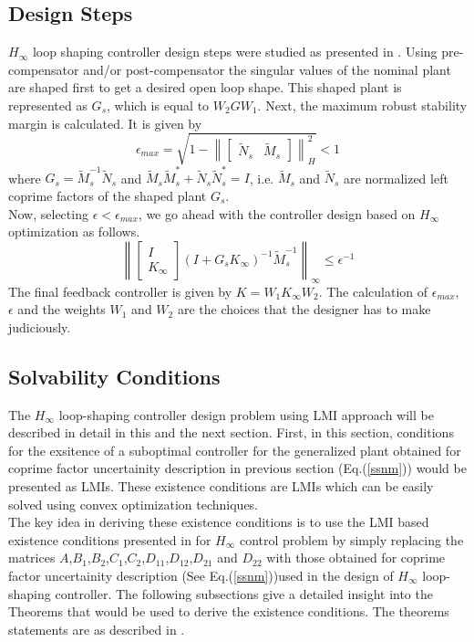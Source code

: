 \documentclass[a4paper,12pt]{article}
\newcommand\norm[1]{\left\lVert#1\right\rVert}
\begin{document}
 	\subsection{Design Steps}	
	$H_{\infty}$  loop shaping controller design steps were studied as presented in \cite{book}. Using pre-compensator and/or post-compensator the singular values of the nominal plant are shaped first to get a desired open loop shape. This shaped plant is represented as $G_{s}$, which is equal to $W_{2}GW_{1}$. Next, the maximum robust stability margin is calculated. It is given by
	\begin{equation}
		\epsilon_{max} = \sqrt{1-\norm{\begin{bmatrix}
		\tilde{N}_{s} & \tilde{M}_{s}\end{bmatrix}}_{H}^{2}} < 1
	\end{equation}
	where $G_{s} = \tilde{M}_{s}^{-1}\tilde{N}_{s}$ and $\tilde{M}_{s}\tilde{M}_{s}^{*} + \tilde{N}_{s}\tilde{N}_{s}^{*} = I $, i.e. $\tilde{M}_{s}$ and $\tilde{N}_{s}$ are normalized left coprime factors of the shaped plant $G_{s}$.\\
	Now, selecting $\epsilon < \epsilon_{max}$, we go ahead with the controller design based on $H_{\infty}$ optimization as follows.
	\begin{equation}
	\norm{\begin{bmatrix}
	I \\ K_{\infty}
	\end{bmatrix}
	(I+G_{s}K_{\infty})^{-1}\tilde{M}_{s}^{-1}}_{\infty} \leq \epsilon^{-1}
	\end{equation}
	The final feedback controller is given by $K=W_{1}K_{\infty}W_{2}$. The calculation of $\epsilon_{max}$, $\epsilon$ and the weights $W_{1}$ and $W_{2}$ are the choices that the designer has to make judiciously.
	\subsection{Solvability Conditions}
		The $H_{\infty}$	 loop-shaping controller design problem using LMI approach will be described in detail in this and the next section. First, in this section, conditions for the exsitence of a suboptimal controller for the generalized plant obtained for coprime factor uncertainity description in previous section (Eq.(\ref{ssnm})) would be presented as LMIs. These existence conditions are LMIs which can be easily solved using convex optimization techniques.\\
		The key idea in deriving these existence conditions is to use the LMI based existence conditions presented in \cite{Pasca} for $H_{\infty}$ control problem by simply replacing the matrices $A$,$B_{1}$,$B_{2}$,$C_{1}$,$C_{2}$,$D_{11}$,$D_{12}$,$D_{21}$ and $D_{22}$ with those obtained for coprime factor uncertainity description (See Eq.(\ref{ssnm}))used in the design of $H_{\infty}$ loop-shaping controller. The following subsections give a detailed insight into the Theorems that would be used to derive the existence conditions. The theorems statements are as described in \cite{Pasca}.
\end{document}
